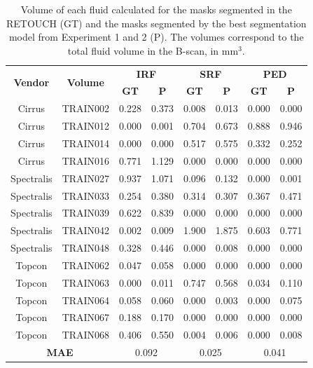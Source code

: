 \begin{table}[!ht]
	\centering
	\caption{Volume of each fluid calculated for the masks segmented in the RETOUCH (GT) and the masks segmented by the best segmentation model from Experiment 1 and 2 (P). The volumes correspond to the total fluid volume in the B-scan, in mm$^{3}$.}
	\begin{tabular}{|c|c|cc|cc|cc|}
		\hline
		\multirow{2}{*}{\textbf{Vendor}} & \multirow{2}{*}{\textbf{Volume}} & \multicolumn{2}{c|}{\textbf{IRF}} & \multicolumn{2}{c|}{\textbf{SRF}} & \multicolumn{2}{c|}{\textbf{PED}} \\ \cline{3-8} 
		& & \textbf{GT} & \textbf{P} & \textbf{GT} & \textbf{P} & \textbf{GT} & \textbf{P} \\ \hline
		 Cirrus & TRAIN002 & 0.228 & 0.373 & 0.008 & 0.013 & 0.000 & 0.000 \\
		 Cirrus & TRAIN012 & 0.000 & 0.001 & 0.704 & 0.673 & 0.888 & 0.946 \\
		 Cirrus & TRAIN014 & 0.000 & 0.000 & 0.517 & 0.575 & 0.332 & 0.252 \\
		 Cirrus & TRAIN016 & 0.771 & 1.129 & 0.000 & 0.000 & 0.000 & 0.000 \\
		 Spectralis & TRAIN027 & 0.937 & 1.071 & 0.096 & 0.132 & 0.000 & 0.001 \\
		 Spectralis & TRAIN033 & 0.254 & 0.380 & 0.314 & 0.307 & 0.367 & 0.471 \\
		 Spectralis & TRAIN039 & 0.622 & 0.839 & 0.000 & 0.000 & 0.000 & 0.000 \\
		 Spectralis & TRAIN042 & 0.002 & 0.009 & 1.900 & 1.875 & 0.603 & 0.771 \\
		 Spectralis & TRAIN048 & 0.328 & 0.446 & 0.000 & 0.008 & 0.000 & 0.000 \\
		 Topcon & TRAIN062 & 0.047 & 0.058 & 0.000 & 0.000 & 0.000 & 0.000 \\
		 Topcon & TRAIN063 & 0.000 & 0.011 & 0.747 & 0.568 & 0.034 & 0.110 \\
		 Topcon & TRAIN064 & 0.058 & 0.060 & 0.000 & 0.003 & 0.000 & 0.075 \\
		 Topcon & TRAIN067 & 0.188 & 0.170 & 0.000 & 0.000 & 0.000 & 0.000 \\
		 Topcon & TRAIN068 & 0.406 & 0.550 & 0.004 & 0.006 & 0.000 & 0.008 \\ \hline
		 \multicolumn{2}{|c|}{\textbf{MAE}} & \multicolumn{2}{c|}{0.092} & \multicolumn{2}{c|}{0.025} & \multicolumn{2}{c|}{0.041} \\ \hline
		 
	\end{tabular}
	\label{tab:FluidVolumesExperiment5}
\end{table}

